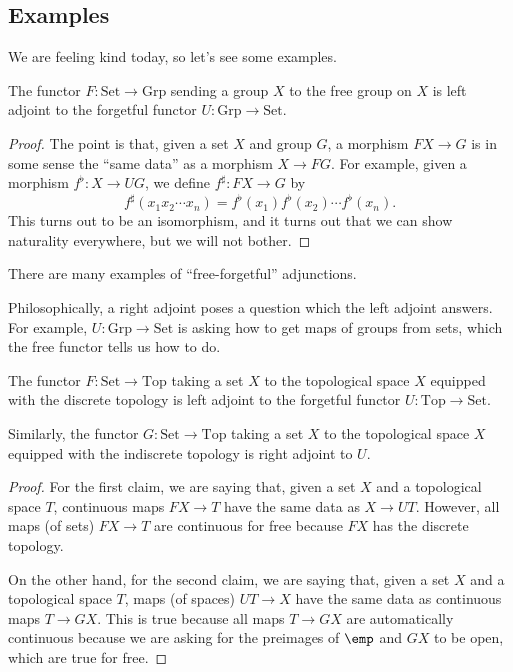 \subsection{Examples}
We are feeling kind today, so let's see some examples.
\begin{exe}
	The functor $F:\mathrm{Set}\to\mathrm{Grp}$ sending a group $X$ to the free group on $X$ is left adjoint to the forgetful functor $U:\mathrm{Grp}\to\mathrm{Set}$.
\end{exe}
\begin{proof}
	The point is that, given a set $X$ and group $G$, a morphism $FX\to G$ is in some sense the ``same data'' as a morphism $X\to FG$. For example, given a morphism $f^\flat:X\to UG$, we define $f^\sharp:FX\to G$ by
	\[f^\sharp(x_1x_2\cdots x_n)=f^\flat(x_1)f^\flat(x_2)\cdots f^\flat(x_n).\]
	This turns out to be an isomorphism, and it turns out that we can show naturality everywhere, but we will not bother.
\end{proof}
\begin{remark}
	There are many examples of ``free-forgetful'' adjunctions.
\end{remark}
\begin{remark}
	Philosophically, a right adjoint poses a question which the left adjoint answers. For example, $U:\mathrm{Grp}\to\mathrm{Set}$ is asking how to get maps of groups from sets, which the free functor tells us how to do.
\end{remark}
\begin{exe}
	The functor $F:\mathrm{Set}\to\mathrm{Top}$ taking a set $X$ to the topological space $X$ equipped with the discrete topology is left adjoint to the forgetful functor $U:\mathrm{Top}\to\mathrm{Set}$.

	Similarly, the functor $G:\mathrm{Set}\to\mathrm{Top}$ taking a set $X$ to the topological space $X$ equipped with the indiscrete topology is right adjoint to $U$.
\end{exe}
\begin{proof}
	For the first claim, we are saying that, given a set $X$ and a topological space $T$, continuous maps $FX\to T$ have the same data as $X\to UT$. However, all maps (of sets) $FX\to T$ are continuous for free because $FX$ has the discrete topology.

	On the other hand, for the second claim, we are saying that, given a set $X$ and a topological space $T$, maps (of spaces) $UT\to X$ have the same data as continuous maps $T\to GX$. This is true because all maps $T\to GX$ are automatically continuous because we are asking for the preimages of $\emp$ and $GX$ to be open, which are true for free.
\end{proof}

